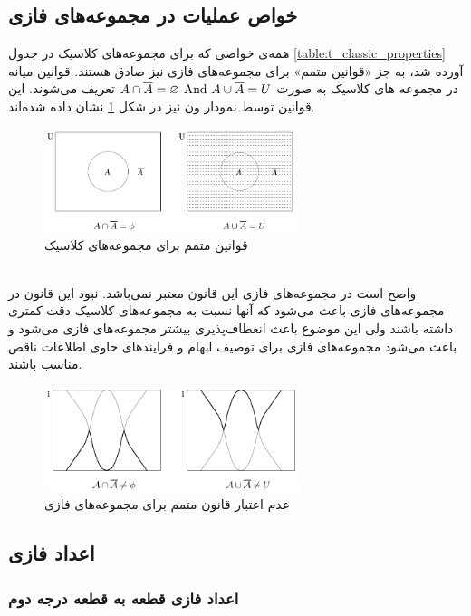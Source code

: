 \documentclass[12pt,a4paper]{article}
\theoremstyle{definition}
\begin{document}
 \subsection{‌خواص عملیات در مجموعه‌های فازی}
همه‌ی خواصی که برای مجموعه‌های کلاسیک در جدول 
\ref{table:t_classic_properties}
آورده شد، به جز «قوانین متمم» برای مجموعه‌های فازی نیز صادق هستند. 
قوانین میانه در مجموعه های کلاسیک به صورت 
$
A \cap \overline{A} = \varnothing {\rm \ And}\ A \cup \overline{A} = U $
تعریف می‌شوند. این قوانین توسط نمودار ون نیز در شکل 
\ref{fig:f_fset_excludedmiddle_classic}
نشان داده شده‌اند. 
\begin{figure}[!htbp]
	\centering 
	\includegraphics[width=75mm]{Images/Fig12.png}
	\vspace{-0.5cm}
	\caption{قوانین متمم برای مجموعه‌های کلاسیک} \label{fig:f_fset_excludedmiddle_classic}
\end{figure}\\
واضح است در مجموعه‌های فازی این قانون معتبر نمی‌باشد. نبود این قانون در مجموعه‌های فازی باعث می‌شود که آنها نسبت به مجموعه‌های کلاسیک دقت کمتری داشته باشند ولی این موضوع باعث انعطاف‌پذیری بیشتر مجموعه‌های فازی می‌شود و باعث می‌شود مجموعه‌های فازی برای توصیف ابهام و فرایندهای حاوی اطلاعات ناقص مناسب باشند.
\begin{figure}[h]
	\centering 
	\includegraphics[width=75mm]{Images/Fig13.png}
	\vspace{-0.5cm}
	\caption{عدم اعتبار قانون متمم برای مجموعه‌های فازی} \label{fig:f_fset_excludedmiddle_fuzzy}
\end{figure}\cite{Bojadziev2007} 

 \subsection{‌اعداد فازی} 
 
  \subsubsection{ ‌اعداد فازی قطعه به قطعه درجه دوم}
\end{document}
